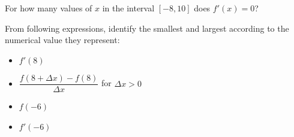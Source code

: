 \documentclass[handout]{ximera}
\begin{document}
\begin{problem}
For how many values of $x$ in the interval $[-8, 10]$ does $f'(x)=0$?
\end{problem}

\begin{problem}
From following expressions, identify the smallest and largest according to the numerical value they represent:

\begin{itemize}
\item $f'(8)$
\item $\dfrac{f(8+\Delta x)-f(8)}{\Delta x}$ for $\Delta x > 0$
\item $f(-6)$
\item $f'(-6)$
\end{itemize}
\end{problem}
\end{document}
